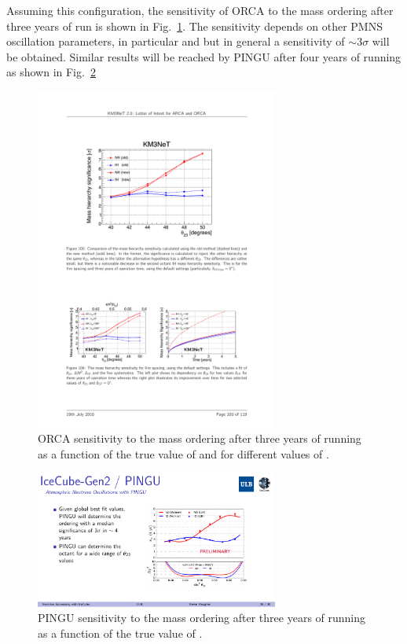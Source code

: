 Assuming this configuration, the sensitivity of ORCA to the mass ordering after three years of run is shown in Fig.~\ref{fig:orcasensi}. The sensitivity depends on other PMNS oscillation parameters, in particular \thatm and \dcp but in general a sensitivity of $\sim3\sigma$ will be obtained. Similar results will be reached by PINGU after four years of running as shown in Fig.~\ref{fig:pingusensi}

\begin{figure} [htbp!]
\begin{center}
\includegraphics[width=8cm]{figures/orca_sensi.pdf}
\caption{\label{fig:orcasensi} ORCA sensitivity to the mass ordering after three years of running as a function of the true value of \thatm and for different values of \dcp.}
\end{center}
\end{figure}

\begin{figure} [htbp!]
\begin{center}
\includegraphics[width=8cm]{figures/pingu_sensi.pdf}
\caption{\label{fig:pingusensi} PINGU sensitivity to the mass ordering after three years of running as a function of the true value of \thatm.}
\end{center}
\end{figure}


